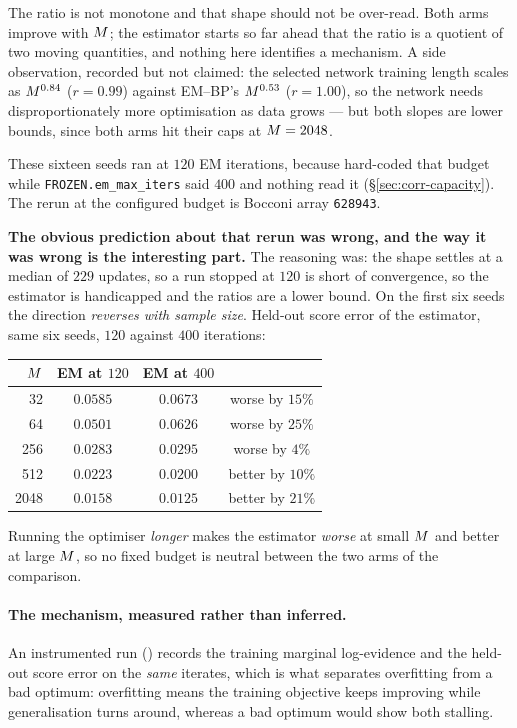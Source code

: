 The ratio is not monotone and that shape should not be over-read. Both arms improve with $M$;
the estimator starts so far ahead that the ratio is a quotient of two moving quantities, and
nothing here identifies a mechanism. A side observation, recorded but not claimed: the selected
network training length scales as $M^{0.84}$ ($r=0.99$) against EM--BP's $M^{0.53}$
($r=1.00$), so the network needs disproportionately more optimisation as data grows --- but both
slopes are lower bounds, since both arms hit their caps at $M=2048$.

\begin{pitfall}
These sixteen seeds ran at $120$ EM iterations, because  hard-coded that budget
while \texttt{FROZEN.em\_max\_iters} said $400$ and nothing read it (\S\ref{sec:corr-capacity}).
The rerun at the configured budget is Bocconi array \texttt{628943}.

\textbf{The obvious prediction about that rerun was wrong, and the way it was wrong is the
interesting part.} The reasoning was: the shape settles at a median of $229$ updates, so a run
stopped at $120$ is short of convergence, so the estimator is handicapped and the ratios are a
lower bound. On the first six seeds the direction \emph{reverses with sample size}. Held-out score
error of the estimator, same six seeds, $120$ against $400$ iterations:

\begin{center}\small
\begin{tabular}{@{}rccc@{}}
\toprule
$M$ & EM at $120$ & EM at $400$ & \\
\midrule
32   & $0.0585$ & $0.0673$ & worse by $15\%$ \\
64   & $0.0501$ & $0.0626$ & worse by $25\%$ \\
256  & $0.0283$ & $0.0295$ & worse by $4\%$ \\
512  & $0.0223$ & $0.0200$ & better by $10\%$ \\
2048 & $0.0158$ & $0.0125$ & better by $21\%$ \\
\bottomrule
\end{tabular}
\end{center}

\noindent
Running the optimiser \emph{longer} makes the estimator \emph{worse} at small $M$ and better
at large $M$, so no fixed budget is neutral between the two arms of the comparison.

\paragraph{The mechanism, measured rather than inferred.}
\label{sec:em-overfitting}
An instrumented run
() records the training marginal log-evidence and
the held-out score error on the \emph{same} iterates, which is what separates overfitting from a
bad optimum: overfitting means the training objective keeps improving while generalisation turns
around, whereas a bad optimum would show both stalling.


\end{pitfall}
